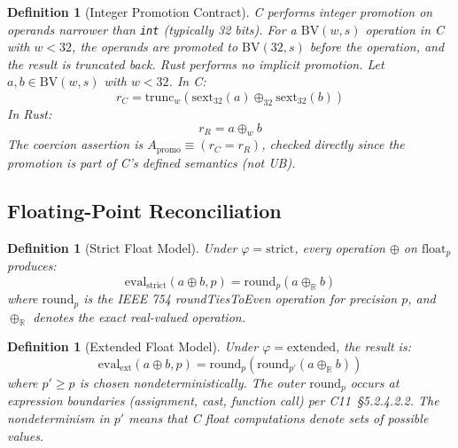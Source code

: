 \documentclass[11pt]{article}
\newtheorem{definition}[theorem]{Definition}
\newcommand{\BV}{\mathrm{BV}}
\newcommand{\trunc}{\mathrm{trunc}}
\begin{document}
\begin{definition}[Integer Promotion Contract]
\label{def:promo-contract}
C performs integer promotion on operands narrower than \texttt{int} (typically 32 bits). For a $\BV(w, s)$ operation in C with $w < 32$, the operands are promoted to $\BV(32, s)$ before the operation, and the result is truncated back. Rust performs no implicit promotion. Let $a, b \in \BV(w, s)$ with $w < 32$. In C:
\[
r_C = \trunc_w(\mathrm{sext}_{32}(a) \oplus_{32} \mathrm{sext}_{32}(b))
\]
In Rust:
\[
r_R = a \oplus_w b
\]
The coercion assertion is $A_{\mathrm{promo}} \equiv (r_C = r_R)$, checked directly since the promotion is part of C's defined semantics (not UB).
\end{definition}


\subsection{Floating-Point Reconciliation}
\label{sec:fp-reconciliation}

\begin{definition}[Strict Float Model]
\label{def:strict-float}
Under $\varphi = \mathrm{strict}$, every operation $\oplus$ on $\mathrm{float}_p$ produces:
\[
\mathrm{eval}_{\mathrm{strict}}(a \oplus b, p) = \mathrm{round}_p(a \oplus_{\mathbb{R}} b)
\]
where $\mathrm{round}_p$ is the IEEE 754 roundTiesToEven operation for precision $p$, and $\oplus_{\mathbb{R}}$ denotes the exact real-valued operation.
\end{definition}

\begin{definition}[Extended Float Model]
\label{def:ext-float}
Under $\varphi = \mathrm{extended}$, the result is:
\[
\mathrm{eval}_{\mathrm{ext}}(a \oplus b, p) = \mathrm{round}_p(\mathrm{round}_{p'}(a \oplus_{\mathbb{R}} b))
\]
where $p' \geq p$ is chosen nondeterministically. The outer $\mathrm{round}_p$ occurs at expression boundaries (assignment, cast, function call) per C11~\S5.2.4.2.2. The nondeterminism in $p'$ means that C float computations denote \emph{sets} of possible values.
\end{definition}
\end{document}
